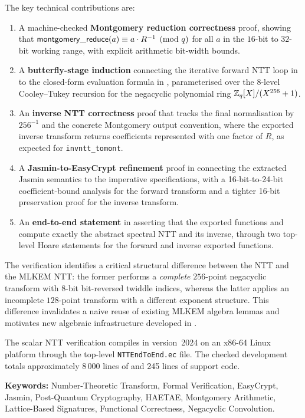 \medskip
\noindent
The key technical contributions are:
\begin{enumerate}
  \item A machine-checked \textbf{Montgomery reduction correctness} proof,
        showing that $\mathsf{montgomery\_reduce}(a) \equiv a \cdot R^{-1}
        \pmod{q}$ for all $a$ in the $16$-bit to $32$-bit working range, with
        explicit arithmetic bit-width bounds.

  \item A \textbf{butterfly-stage induction} connecting the iterative
        forward NTT loop in  to the closed-form evaluation
        formula in , parameterised over the 8-level
        Cooley--Tukey recursion for the negacyclic polynomial ring
        $\mathbb{Z}_q[X]/(X^{256}+1)$.

  \item An \textbf{inverse NTT correctness} proof that tracks the final
        normalisation by \(256^{-1}\) and the concrete Montgomery output
        convention, where the exported inverse transform returns coefficients
        represented with one factor of \(R\), as expected for
        \texttt{invntt\_tomont}.

  \item A \textbf{Jasmin-to-EasyCrypt refinement} proof in
         connecting the extracted Jasmin semantics to the
        imperative specifications, with a 16-bit-to-24-bit coefficient-bound
        analysis for the forward transform and a tighter 16-bit preservation
        proof for the inverse transform.

  \item An \textbf{end-to-end statement} in  asserting
        that the \jasmin{} exported functions  and
         compute exactly the abstract spectral NTT and
        its inverse, through two top-level Hoare statements for the forward
        and inverse exported functions.
\end{enumerate}

\noindent
The verification identifies a critical structural difference between the
\haetae{} NTT and the MLKEM NTT: the former performs a \emph{complete}
$256$-point negacyclic transform with 8-bit bit-reversed twiddle indices,
whereas the latter applies an incomplete $128$-point transform with a
different exponent structure.
This difference invalidates a naive reuse of existing MLKEM algebra lemmas
and motivates new algebraic infrastructure developed in
.

\medskip
\noindent
The scalar NTT verification compiles in \easycrypt{} version~2024 on an
x86-64 Linux platform through the top-level \texttt{NTTEndToEnd.ec} file.
The checked development totals approximately 8\,000 lines of \easycrypt{}
and 245 lines of \jasmin{} support code.

\vspace{1em}
\noindent
\textbf{Keywords:} Number-Theoretic Transform, Formal Verification,
EasyCrypt, Jasmin, Post-Quantum Cryptography, HAETAE, Montgomery Arithmetic,
Lattice-Based Signatures, Functional Correctness, Negacyclic Convolution.
